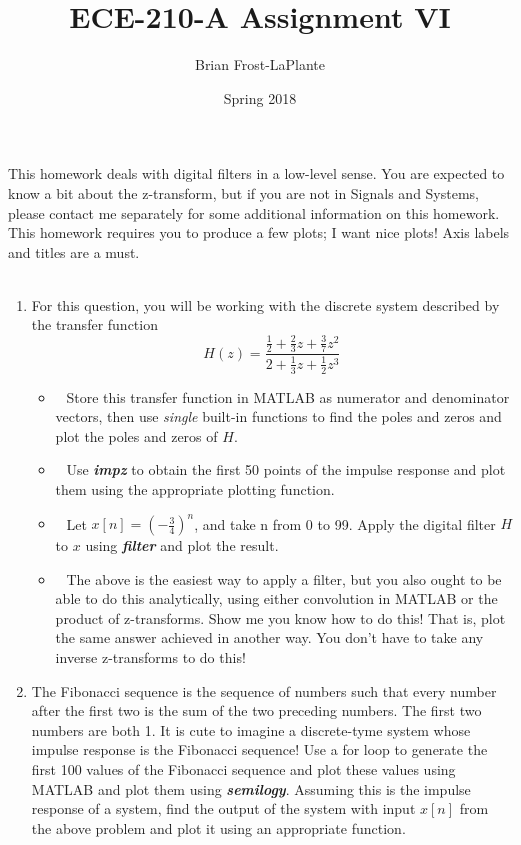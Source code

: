 \documentclass{article}
\title{ECE-210-A Assignment VI}
\author{Brian Frost-LaPlante}
\date{Spring 2018}
\begin{document}
\maketitle
\noindent This homework deals with digital filters in a low-level sense. You are expected to know a bit about the z-transform, but if you are not in Signals and Systems, please contact me separately for some additional information on this homework. This homework requires you to produce a few plots; I want nice plots! Axis labels and titles are a must.
\\\\
\begin{enumerate}[leftmargin=0cm,itemindent=.5cm,labelwidth=\itemindent,labelsep=0cm,align=left,label=\textbf{\arabic*.}]
\item For this question, you will be working with the discrete system described by the transfer function 
$$H(z) = \frac{\frac{1}{2}+\frac{2}{3}z+\frac{3}{7}z^2}{2+\frac{1}{3}z+\frac{1}{2}z^3}$$
\begin{itemize}
	\item $\:\:$ Store this transfer function in MATLAB as numerator and denominator vectors, then use \textit{single} built-in functions to find the poles and zeros and plot the poles and zeros of $H$.
	\item $\:\:$ Use \textit{\textbf{impz}} to obtain the first 50 points of the impulse response and plot them using the appropriate plotting function. 
	\item $\:\:$ Let $x[n] = (-\frac{3}{4})^n$, and take n from 0 to 99. Apply the digital filter $H$ to $x$ using \textit{\textbf{filter}} and plot the result. 
	\item $\:\:$ The above is the easiest way to apply a filter, but you also ought to be able to do this analytically, using either convolution in MATLAB or the product of z-transforms. Show me you know how to do this! That is, plot the same answer achieved in another way. You don't have to take any inverse z-transforms to do this!
\end{itemize}
\item The Fibonacci sequence is the sequence of numbers such that every number after the first two is the sum of the two preceding numbers. The first two numbers are both 1. It is cute to imagine a discrete-tyme system whose impulse response is the Fibonacci sequence! Use a for loop to generate the first 100 values of the Fibonacci sequence and plot these values using MATLAB and plot them using \textit{\textbf{semilogy}}. Assuming this is the impulse response of a system, find the output of the system with input $x[n]$ from the above problem and plot it using an appropriate function.
\end{enumerate}
\end{document}
